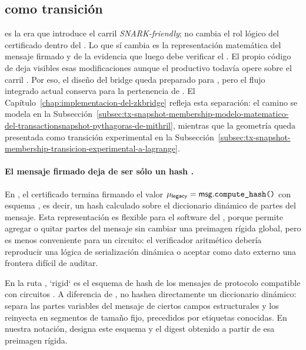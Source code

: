 \subsection{\Lagrange como transición}
\label{subsec:artefactos-certificados-y-versiones-lagrange-como-transicion}

\Lagrange es la era que introduce el carril \textit{SNARK-friendly}; no cambia el rol lógico del certificado dentro del \zkBridge. Lo que sí cambia es la representación matemática del mensaje firmado y de la evidencia que luego debe verificar el \zkBridge. El propio código de \Mithril deja visibles esas modificaciones aunque el \MithrilAggregator productivo todavía opere sobre el carril \Pythagoras. Por eso, el diseño del bridge queda preparado para \Lagrange, pero el flujo integrado actual conserva \Pythagoras para la pertenencia de \CardanoTransactions. El Capítulo~\ref{chap:implementacion-del-zkbridge} refleja esta separación: el camino \Pythagoras se modela en la Subsección~\ref{subsec:tx-snapshot-membership-modelo-matematico-del-transactionsnapshot-pythagoras-de-mithril}, mientras que la geometría \Lagrange queda presentada como transición experimental en la Subsección~\ref{subsec:tx-snapshot-membership-transicion-experimental-a-lagrange}.

\paragraph{El mensaje firmado deja de ser sólo un hash \LegacyHashScheme.}
En \Pythagoras, el certificado termina firmando el valor $\mu_{\mathsf{legacy}} = \mathsf{msg}.\texttt{compute\_hash()}$ con esquema \LegacyHashScheme, es decir, un hash calculado sobre el diccionario dinámico de partes del mensaje. Esta representación es flexible para el software del \MithrilAggregator, porque permite agregar o quitar partes del mensaje sin cambiar una preimagen rígida global, pero es menos conveniente para un circuito: el verificador aritmético debería reproducir una lógica de serialización dinámica o aceptar como dato externo una frontera difícil de auditar.

En la ruta \Lagrange, `rigid` es el esquema de hash de los mensajes de protocolo compatible con circuitos \SNARK. A diferencia de \LegacyHashScheme, no hashea directamente un diccionario dinámico: separa las partes variables del mensaje de ciertos campos estructurales y los reinyecta en segmentos de tamaño fijo, precedidos por etiquetas conocidas. En nuestra notación, \RigidHashScheme designa este esquema y \RigidDigest el digest obtenido a partir de esa preimagen rígida.

